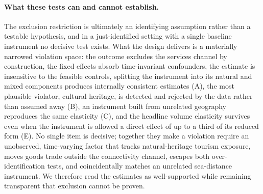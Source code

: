 \paragraph{What these tests can and cannot establish.} The exclusion
restriction is ultimately an identifying assumption rather than a testable
hypothesis, and in a just-identified setting with a single baseline instrument
no decisive test exists. What the design delivers is a materially narrowed
violation space: the outcome excludes the services channel by construction,
the fixed effects absorb time-invariant confounders, the estimate is
insensitive to the feasible controls, splitting the instrument into its
natural and mixed components produces internally consistent estimates (A),
the most plausible violator, cultural heritage, is detected and rejected by
the data rather than assumed away (B), an instrument
built from unrelated geography reproduces the same elasticity (C), and the
headline volume elasticity survives even when the instrument is allowed a
direct effect of up to a third of its reduced form (E). No single
item is decisive; together they make a violation require an unobserved,
time-varying factor that tracks natural-heritage tourism exposure, moves
goods trade outside the connectivity channel, escapes both
over-identification tests, and coincidentally matches an unrelated
sea-distance instrument. We therefore read the estimates as well-supported
while remaining transparent that exclusion cannot be proven.

